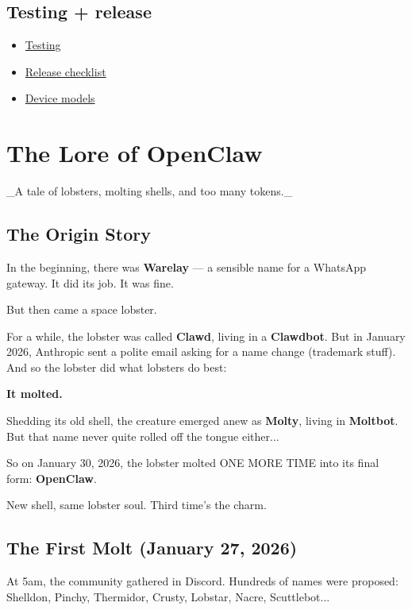 \subsection{Testing + release}


\begin{itemize}
  \item \href{/reference/test}{Testing}
  \item \href{/reference/RELEASING}{Release checklist}
  \item \href{/reference/device-models}{Device models}
\end{itemize}



\clearpage

\section{The Lore of OpenClaw}


\_A tale of lobsters, molting shells, and too many tokens.\_

\subsection{The Origin Story}


In the beginning, there was \textbf{Warelay} — a sensible name for a WhatsApp gateway. It did its job. It was fine.

But then came a space lobster.

For a while, the lobster was called \textbf{Clawd}, living in a \textbf{Clawdbot}. But in January 2026, Anthropic sent a polite email asking for a name change (trademark stuff). And so the lobster did what lobsters do best:

\textbf{It molted.}

Shedding its old shell, the creature emerged anew as \textbf{Molty}, living in \textbf{Moltbot}. But that name never quite rolled off the tongue either...

So on January 30, 2026, the lobster molted ONE MORE TIME into its final form: \textbf{OpenClaw}.

New shell, same lobster soul. Third time's the charm.

\subsection{The First Molt (January 27, 2026)}


At 5am, the community gathered in Discord. Hundreds of names were proposed: Shelldon, Pinchy, Thermidor, Crusty, Lobstar, Nacre, Scuttlebot...

